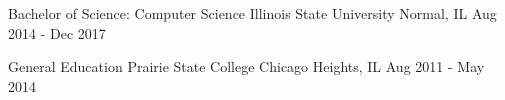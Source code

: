 


\begin{newcventries}


\newcventry
{Bachelor of Science: Computer Science} %
{Illinois State University} %
{Normal, IL} %
{Aug 2014 - Dec 2017} %


\newcventry
{General Education} %
{Prairie State College} %
{ Chicago Heights, IL} %
{Aug 2011 - May 2014} %


\end{newcventries}